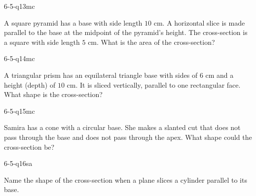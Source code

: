 \begin{practiceQuestion}{6-5-q13}{mc}
\begin{questionText}
A square pyramid has a base with side length $10$ cm. A horizontal slice is made parallel to the base at the midpoint of the pyramid's height. The cross-section is a square with side length $5$ cm. What is the area of the cross-section?
\end{questionText}
\end{practiceQuestion}

\begin{practiceQuestion}{6-5-q14}{mc}
\begin{questionText}
A triangular prism has an equilateral triangle base with sides of $6$ cm and a height (depth) of $10$ cm. It is sliced vertically, parallel to one rectangular face. What shape is the cross-section?
\end{questionText}
\end{practiceQuestion}

\begin{practiceQuestion}{6-5-q15}{mc}
\begin{questionText}
Samira has a cone with a circular base. She makes a slanted cut that does not pass through the base and does not pass through the apex. What shape could the cross-section be?
\end{questionText}
\end{practiceQuestion}


\begin{practiceQuestion}{6-5-q16}{sa}
\begin{questionText}
Name the shape of the cross-section when a plane slices a cylinder parallel to its base.
\end{questionText}
\end{practiceQuestion}

